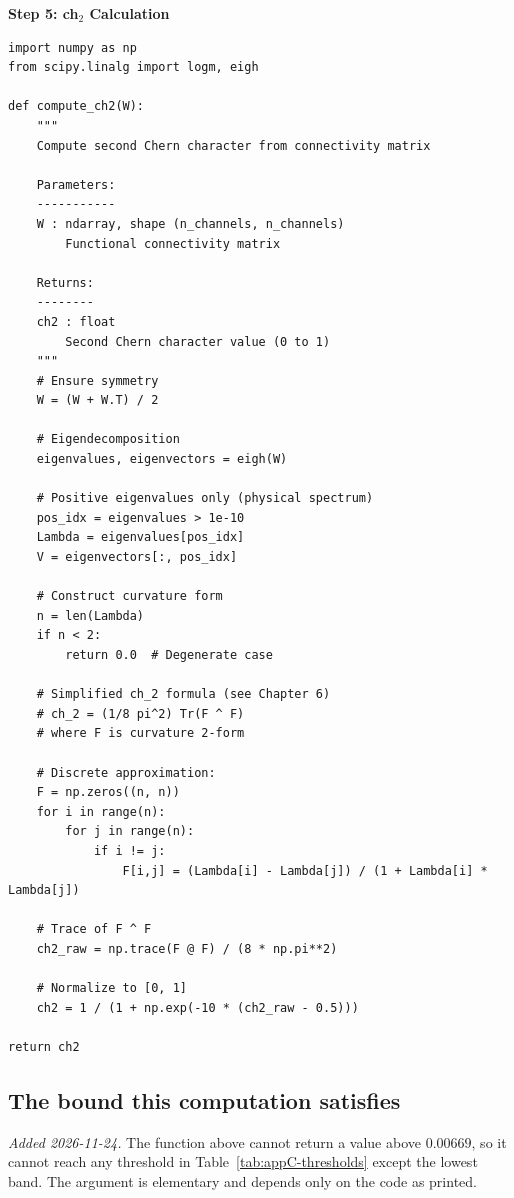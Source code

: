 \textbf{Step 5: ch$_2$ Calculation}
\begin{verbatim}
import numpy as np
from scipy.linalg import logm, eigh

def compute_ch2(W):
    """
    Compute second Chern character from connectivity matrix

    Parameters:
    -----------
    W : ndarray, shape (n_channels, n_channels)
        Functional connectivity matrix

    Returns:
    --------
    ch2 : float
        Second Chern character value (0 to 1)
    """
    # Ensure symmetry
    W = (W + W.T) / 2

    # Eigendecomposition
    eigenvalues, eigenvectors = eigh(W)

    # Positive eigenvalues only (physical spectrum)
    pos_idx = eigenvalues > 1e-10
    Lambda = eigenvalues[pos_idx]
    V = eigenvectors[:, pos_idx]

    # Construct curvature form
    n = len(Lambda)
    if n < 2:
        return 0.0  # Degenerate case

    # Simplified ch_2 formula (see Chapter 6)
    # ch_2 = (1/8 pi^2) Tr(F ^ F)
    # where F is curvature 2-form

    # Discrete approximation:
    F = np.zeros((n, n))
    for i in range(n):
        for j in range(n):
            if i != j:
                F[i,j] = (Lambda[i] - Lambda[j]) / (1 + Lambda[i] * Lambda[j])

    # Trace of F ^ F
    ch2_raw = np.trace(F @ F) / (8 * np.pi**2)

    # Normalize to [0, 1]
    ch2 = 1 / (1 + np.exp(-10 * (ch2_raw - 0.5)))

return ch2
\end{verbatim}

\subsection{The bound this computation satisfies}
\label{sec:appC-bound}

\emph{Added 2026-11-24.} The function above cannot return a value above
$0.00669$, so it cannot reach any threshold in
Table~\ref{tab:appC-thresholds} except the lowest band. The argument is
elementary and depends only on the code as printed.

